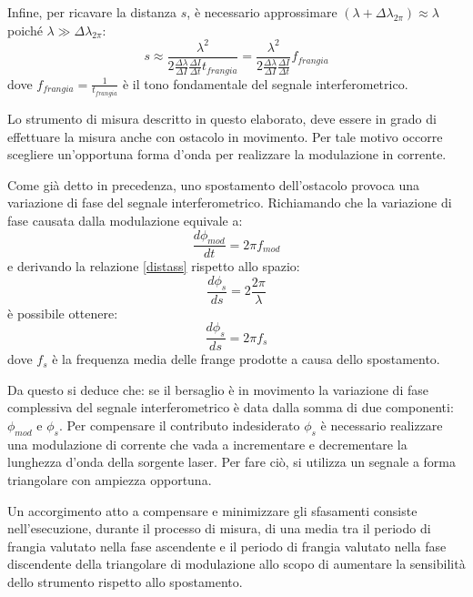 \begin{enumerate}
	Infine, per ricavare la distanza $s$, è necessario approssimare $(\lambda + \Delta \lambda_{2\pi}) \approx \lambda$ poiché $\lambda \gg \Delta \lambda_{2\pi}$:
	\begin{equation}
		s \approx \frac{\lambda^2}{2\frac{\Delta \lambda}{\Delta I}\frac{\Delta I}{\Delta t} t_{frangia}} =  \frac{\lambda^2}{2\frac{\Delta \lambda}{\Delta I}\frac{\Delta I}{\Delta t}}f_{frangia}
	\end{equation}
	dove $f_{frangia}=\frac{1}{t_{frangia}}$ è il tono fondamentale del segnale interferometrico.
	
	Lo strumento di misura descritto in questo elaborato, deve essere in grado di effettuare la misura anche con ostacolo in movimento. Per tale motivo occorre scegliere un'opportuna forma d'onda per realizzare la modulazione in corrente.
	
	Come già detto in precedenza, uno spostamento dell'ostacolo provoca una variazione di fase del segnale interferometrico. Richiamando che la variazione di fase causata dalla modulazione equivale a:
	\begin{equation}
		\frac{d\phi_{mod}}{dt} = 2 \pi f_{mod}
	\end{equation}
	e derivando la relazione \ref{distass} rispetto allo spazio:
	\begin{equation}
		\frac{d\phi_s}{ds}=2\frac{2\pi}{\lambda}
	\end{equation}
	è possibile ottenere:
	\begin{equation}
		\frac{d\phi_s}{ds}=2\pi f_s
	\end{equation}
	dove $f_s$ è la frequenza media delle frange prodotte a causa dello spostamento.
	
	Da questo si deduce che: se il bersaglio è in movimento la variazione di fase complessiva del segnale interferometrico è data dalla somma di due componenti: $\phi_{mod}$ e $\phi_s$.
	Per compensare il contributo indesiderato $\phi_s$ è necessario realizzare una modulazione di corrente che vada a incrementare e decrementare la lunghezza d'onda della sorgente laser. Per fare ciò, si utilizza un segnale a forma triangolare con ampiezza opportuna.
	
	Un accorgimento atto a compensare e minimizzare gli sfasamenti consiste nell'esecuzione, durante il processo di misura, di una media tra il periodo di frangia valutato nella fase ascendente e il periodo di frangia valutato nella fase discendente della triangolare di modulazione allo scopo di aumentare la sensibilità dello strumento rispetto allo spostamento. 
	

\end{enumerate}
